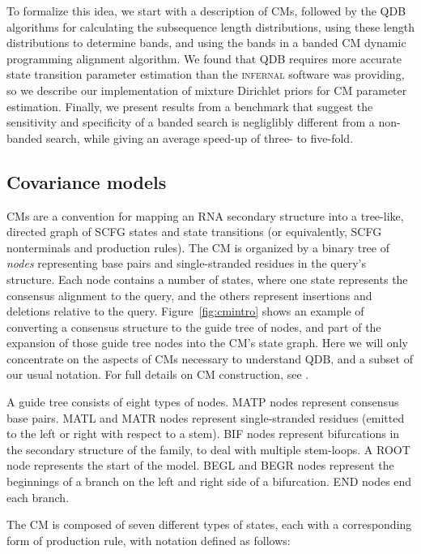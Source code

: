 \documentclass[11pt]{article}
\newif\ifdraft
\begin{document}
To formalize this idea, we start with a description of CMs, followed
by the QDB algorithms for calculating the subsequence length
distributions, using these length distributions to determine bands,
and using the bands in a banded CM dynamic programming alignment
algorithm.  We found that QDB requires more accurate state transition
parameter estimation than the \textsc{infernal} software was
providing, so we describe our implementation of mixture Dirichlet
priors for CM parameter estimation. Finally, we present results from a
benchmark that suggest the sensitivity and specificity of a banded
search is negliglibly different from a non-banded search, while giving
an average speed-up of three- to five-fold.

\subsection{Covariance models}

CMs are a convention for mapping an RNA secondary structure into a
tree-like, directed graph of SCFG states and state transitions (or
equivalently, SCFG nonterminals and production rules). The CM is
organized by a binary tree of \emph{nodes} representing base pairs and
single-stranded residues in the query's structure. Each node contains
a number of states, where one state represents the consensus alignment
to the query, and the others represent insertions and deletions
relative to the query.  Figure~\ref{fig:cmintro} shows an example of
converting a consensus structure to the guide tree of nodes, and part
of the expansion of those guide tree nodes into the CM's state graph.
Here we will only concentrate on the aspects of CMs necessary to
understand QDB, and a subset of our usual notation. For full details
on CM construction, see \cite{Eddy02b,infguide03}.

\ifdraft

\fi

A guide tree consists of eight types of nodes. MATP nodes represent
consensus base pairs. MATL and MATR nodes represent single-stranded
residues (emitted to the left or right with respect to a stem). BIF
nodes represent bifurcations in the secondary structure of the family,
to deal with multiple stem-loops. A ROOT node represents the start of
the model. BEGL and BEGR nodes represent the beginnings of a branch on
the left and right side of a bifurcation.  END nodes end each branch.

The CM is composed of seven different types of states, each with a
corresponding form of production rule, with notation defined as
follows:
\end{document}
